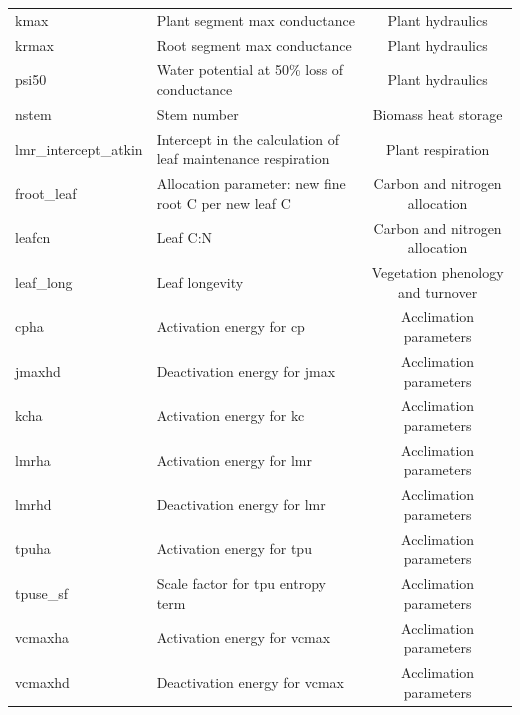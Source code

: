 \documentclass[draft]{agujournal2019}
\begin{document}
\begin{landscape}
\begin{table}[h]
\begin{tabular}{l l c}
kmax & Plant segment max conductance & Plant hydraulics \\
krmax & Root segment max conductance & Plant hydraulics \\
psi50 & Water potential at 50\% loss of conductance & Plant hydraulics \\
nstem & Stem number & Biomass heat storage \\
lmr\_intercept\_atkin & Intercept in the calculation of leaf maintenance respiration& Plant respiration \\
froot\_leaf & Allocation parameter: new fine root C per new leaf C & Carbon and nitrogen allocation \\
leafcn & Leaf C:N & Carbon and nitrogen allocation \\
leaf\_long & Leaf longevity & Vegetation phenology and turnover \\
cpha & Activation energy for cp & Acclimation parameters \\
jmaxhd & Deactivation energy for jmax & Acclimation parameters \\
kcha & Activation energy for kc & Acclimation parameters \\
lmrha & Activation energy for lmr & Acclimation parameters \\
lmrhd & Deactivation energy for lmr & Acclimation parameters \\
tpuha & Activation energy for tpu & Acclimation parameters \\
tpuse\_sf & Scale factor for tpu entropy term & Acclimation parameters \\
vcmaxha & Activation energy for vcmax & Acclimation parameters \\
vcmaxhd & Deactivation energy for vcmax & Acclimation parameters \\
 \hline
 \end{tabular}
 \end{table}
\end{landscape}
\end{document}
